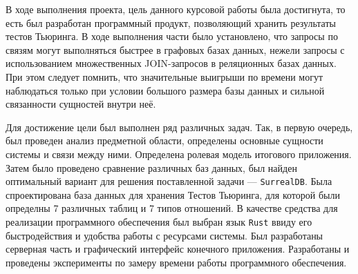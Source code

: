 В ходе выполнения проекта, цель данного курсовой работы была достигнута, то есть был разработан программный продукт, позволяющий хранить результаты тестов Тьюринга.
В ходе выполнения части было установлено, что запросы по связям могут выполняться быстрее в графовых базах данных, нежели запросы с использованием множественных JOIN-запросов в реляционных базах данных.
При этом следует помнить, что значительные выигрыши по времени могут наблюдаться только при условии большого размера базы данных и сильной связанности сущностей внутри неё.

Для достижение цели был выполнен ряд различных задач. 
Так, в первую очередь, был проведен анализ предметной области, определены основные сущности системы и связи между ними. 
Определена ролевая модель итогового приложения.
Затем было проведено сравнение различных баз данных, был найден оптимальный вариант для решения поставленной задачи --- \texttt{SurrealDB}.
Была спроектирована база данных для хранения Тестов Тьюринга, для которой были определны 7 различных таблиц и 7 типов отношений.
В качестве средства для реализации программного обеспечения был выбран язык \texttt{Rust} ввиду его быстродействия и удобства работы с ресурсами системы.
Был разработаны серверная часть и графический интерфейс конечного приложения. Разработаны и проведены эксперименты по замеру времени работы программного обеспечения.

